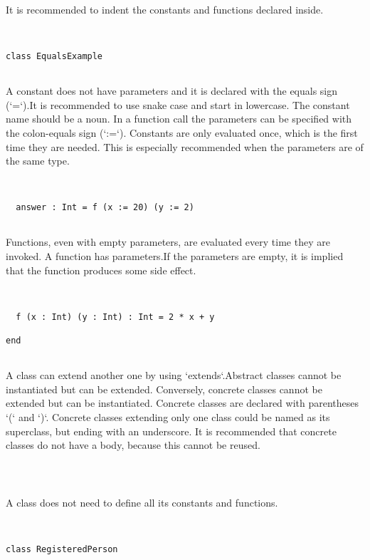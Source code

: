 \documentclass[12pt,a4paper]{article}
\begin{document}
It is recommended to indent the constants and functions declared inside. 


\begin{lstlisting}


class EqualsExample


\end{lstlisting}

A constant does not have parameters and it is declared with the equals sign (`=`).It is recommended to use snake case and start in lowercase.
The constant name should be a noun.
In a function call the parameters can be specified with the colon-equals sign (`:=`).
Constants are only evaluated once, which is the first time they are needed. This is especially recommended when the parameters are of the same type.


\begin{lstlisting}


  answer : Int = f (x := 20) (y := 2)


\end{lstlisting}

Functions, even with empty parameters, are evaluated every time they are invoked. A function has parameters.If the parameters are empty, it is implied that the function produces some side effect.


\begin{lstlisting}


  f (x : Int) (y : Int) : Int = 2 * x + y

end


\end{lstlisting}

A class can extend another one by using `extends`.Abstract classes cannot be instantiated but can be extended.
Conversely, concrete classes cannot be extended but can be instantiated.
Concrete classes are declared with parentheses `(` and `)`.
Concrete classes extending only one class could be named as its superclass, but ending with an underscore. It is recommended that concrete classes do not have a body, because this cannot be reused.


\begin{lstlisting}



\end{lstlisting}

A class does not need to define all its constants and functions. 


\begin{lstlisting}


class RegisteredPerson


\end{lstlisting}
\end{document}
